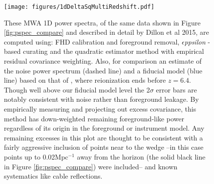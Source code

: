 \documentclass[preprint]{aastex}
\def\eppsilon{{\it $\epsilon$ppsilon }}
\def\dilloncite{Dillon et al 2015}
\begin{document}
\begin{figure}[h!]
\begin{center}
\texttt{[image: figures/1dDeltaSqMultiRedshift.pdf]}
\caption{These MWA 1D power spectra, of the same data shown in Figure \ref{fig:pspec_compare} and described in detail by \dilloncite, are computed using: FHD calibration and foreground removal, \eppsilon-based curating and the quadratic estimator method with empirical residual covariance weighting. Also, for comparison an estimate of the noise power spectrum (dashed line) and a fiducial model (blue line) based on that of \cite{Barkana:2009p1454}, where reionization ends before $z=6.4$. Though well above our fiducial model level the 2$\sigma$ error bars are notably consistent with noise rather than foreground leakage.  By empirically measuring and projecting out excess covariance, this method has down-weighted remaining foreground-like power regardless of its origin in the foreground or instrument model.   Any remaining excesses in this plot are thought to be consistent with a fairly aggressive inclusion of points near to the wedge --in this case points up to 0.02Mpc$^{-1}$ away from the horizon (the solid black line in Figure \ref{fig:pspec_compare}) were included-- and known systematics like cable reflections.\label{fig:1D_pspecs}}
\end{center}
\end{figure}
\end{document}
